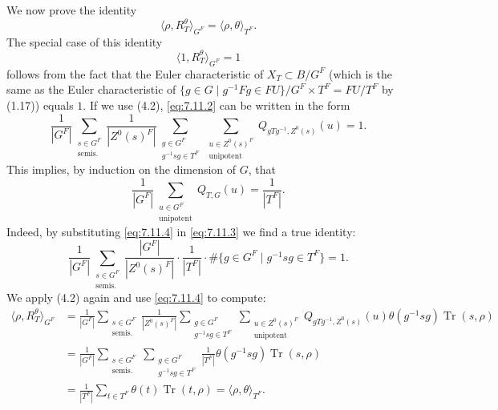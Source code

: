 \documentclass[11pt]{amsart}
\theoremstyle{plain}
\theoremstyle{remark}
\DeclareMathOperator{\Tr}{Tr}
\begin{document}
We now prove the identity
\begin{equation}\label{eq:7.11.1}
\langle \rho, R_T^\theta \rangle_{G^F} = \langle \rho, \theta \rangle_{T^F}.
\end{equation}
The special case of this identity
\begin{equation}\label{eq:7.11.2}
\langle 1, R_T^\theta \rangle_{G^F} = 1
\end{equation}
follows from the fact that the Euler characteristic of $X_T \subset B/G^F$ (which is the same as the Euler characteristic of $\{g \in G \mid g^{-1}Fg \in FU\}/G^F \times T^F = FU/T^F$ by (1.17)) equals $1$. If we use (4.2), \eqref{eq:7.11.2} can be written in the form
\begin{equation}\label{eq:7.11.3}
\frac{1}{|G^F|} \sum_{\substack{s \in G^F \\ \text{semis.}}} \frac{1}{|Z^0(s)^F|} \sum_{\substack{g \in G^F \\ g^{-1}sg \in T^F}} \sum_{\substack{u \in Z^0(s)^F \\ \text{unipotent}}} Q_{gTg^{-1}, Z^0(s)}(u) = 1.
\end{equation}
This implies, by induction on the dimension of $G$, that
\begin{equation}\label{eq:7.11.4}
\frac{1}{|G^F|} \sum_{\substack{u \in G^F \\ \text{unipotent}}} Q_{T,G}(u) = \frac{1}{|T^F|}.
\end{equation}
Indeed, by substituting \eqref{eq:7.11.4} in \eqref{eq:7.11.3} we find a true identity:
\[
\frac{1}{|G^F|} \sum_{\substack{s \in G^F \\ \text{semis.}}} \frac{|G^F|}{|Z^0(s)^F|} \cdot \frac{1}{|T^F|} \cdot \#\{g \in G^F \mid g^{-1}sg \in T^F\} = 1.
\]
We apply (4.2) again and use \eqref{eq:7.11.4} to compute:
\begin{align*}
\langle \rho, R_T^\theta \rangle_{G^F} &= \frac{1}{|G^F|} \sum_{\substack{s \in G^F \\ \text{semis.}}} \frac{1}{|Z^0(s)^F|} \sum_{\substack{g \in G^F \\ g^{-1}sg \in T^F}} \sum_{\substack{u \in Z^0(s)^F \\ \text{unipotent}}} Q_{gTg^{-1}, Z^0(s)}(u) \theta(g^{-1}sg) \Tr(s, \rho) \\
&= \frac{1}{|G^F|} \sum_{\substack{s \in G^F \\ \text{semis.}}} \sum_{\substack{g \in G^F \\ g^{-1}sg \in T^F}} \frac{1}{|T^F|} \theta(g^{-1}sg) \Tr(s, \rho) \\
&= \frac{1}{|T^F|} \sum_{t \in T^F} \theta(t) \Tr(t, \rho) = \langle \rho, \theta \rangle_{T^F}.
\end{align*}
\end{document}
